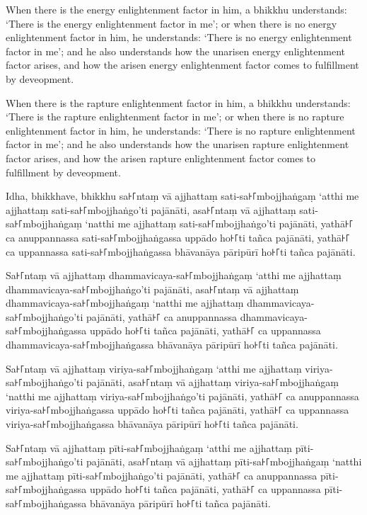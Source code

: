 When there is the energy enlightenment factor in him, a bhikkhu understands:
`There is the energy enlightenment factor in me'; or when there is no energy
enlightenment factor in him, he understands: `There is no energy enlightenment
factor in me'; and he also understands how the unarisen energy enlightenment
factor arises, and how the arisen energy enlightenment factor comes to
fulfillment by deveopment.

When there is the rapture enlightenment factor in him, a bhikkhu understands:
`There is the rapture enlightenment factor in me'; or when there is no rapture
enlightenment factor in him, he understands: `There is no rapture enlightenment
factor in me'; and he also understands how the unarisen rapture enlightenment
factor arises, and how the arisen rapture enlightenment factor comes to
fulfillment by deveopment.

\paliPage

Idha, bhikkhave, bhikkhu
sa꜔꜒ntaṃ vā ajjhattaṃ sati-sa꜔꜒mbojjhaṅgaṃ ‘atthi me ajjhattaṃ sati-sa꜔꜒mbojjhaṅgo’ti pajānāti,
asa꜔꜒ntaṃ vā ajjhattaṃ sati-sa꜔꜒mbojjhaṅgaṃ ‘natthi me ajjhattaṃ sati-sa꜔꜒mbojjhaṅgo’ti pajānāti,
yathā꜔꜒ ca anuppannassa sati-sa꜔꜒mbojjhaṅgassa uppādo ho꜔꜒ti tañca pajānāti,
yathā꜔꜒ ca uppannassa sati-sa꜔꜒mbojjhaṅgassa bhāvanāya pāripūrī ho꜔꜒ti tañca pajānāti.

Sa꜔꜒ntaṃ vā ajjhattaṃ dhammavicaya-sa꜔꜒mbojjhaṅgaṃ ‘atthi me ajjhattaṃ dhammavicaya-sa꜔꜒mbojjhaṅgo’ti pajānāti,
asa꜔꜒ntaṃ vā ajjhattaṃ dhammavicaya-sa꜔꜒mbojjhaṅgaṃ ‘natthi me ajjhattaṃ dhammavicaya-sa꜔꜒mbojjhaṅgo’ti pajānāti,
yathā꜔꜒ ca anuppannassa dhammavicaya-sa꜔꜒mbojjhaṅgassa uppādo ho꜔꜒ti tañca pajānāti,
yathā꜔꜒ ca uppannassa dhammavicaya-sa꜔꜒mbojjhaṅgassa bhāvanāya pāripūrī ho꜔꜒ti tañca pajānāti.

Sa꜔꜒ntaṃ vā ajjhattaṃ viriya-sa꜔꜒mbojjhaṅgaṃ ‘atthi me ajjhattaṃ viriya-sa꜔꜒mbojjhaṅgo’ti pajānāti,
asa꜔꜒ntaṃ vā ajjhattaṃ viriya-sa꜔꜒mbojjhaṅgaṃ ‘natthi me ajjhattaṃ viriya-sa꜔꜒mbojjhaṅgo’ti pajānāti,
yathā꜔꜒ ca anuppannassa viriya-sa꜔꜒mbojjhaṅgassa uppādo ho꜔꜒ti tañca pajānāti,
yathā꜔꜒ ca uppannassa viriya-sa꜔꜒mbojjhaṅgassa bhāvanāya pāripūrī ho꜔꜒ti tañca pajānāti.

Sa꜔꜒ntaṃ vā ajjhattaṃ pīti-sa꜔꜒mbojjhaṅgaṃ ‘atthi me ajjhattaṃ pīti-sa꜔꜒mbojjhaṅgo’ti pajānāti,
asa꜔꜒ntaṃ vā ajjhattaṃ pīti-sa꜔꜒mbojjhaṅgaṃ ‘natthi me ajjhattaṃ pīti-sa꜔꜒mbojjhaṅgo’ti pajānāti,
yathā꜔꜒ ca anuppannassa pīti-sa꜔꜒mbojjhaṅgassa uppādo ho꜔꜒ti tañca pajānāti,
yathā꜔꜒ ca uppannassa pīti-sa꜔꜒mbojjhaṅgassa bhāvanāya pāripūrī ho꜔꜒ti tañca pajānāti.

